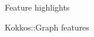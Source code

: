 
\begin{frame}[fragile]

  {\Huge Feature highlights}

  \vspace{10pt}

\end{frame}





%        



\begin{frame}[fragile]\label{sec:new_features}

  {\Huge Kokkos::Graph features}

  \vspace{10pt}

\end{frame}

